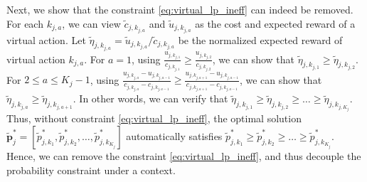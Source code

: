 Next, we show that the constraint \eqref{eq:virtual_lp_ineff} can indeed be removed.
For each $k_{j,a}$, we can view $\tilde{c}_{j,k_{j,a}}$ and $\tilde{u}_{j,k_{j,a}}$ as the cost and expected reward of a virtual action.
Let $\tilde{\eta}_{j,k_{j, a}} = \tilde{u}_{j,k_{j,a}}/\tilde{c}_{j, k_{j, a}}$ be the normalized expected reward of virtual action $k_{j,a}$.
For $a = 1$, using $\frac{u_{j, k_{j,1}}}{c_{j, k_{j,1}}} \geq \frac{u_{j, k_{j,2}}}{c_{j, k_{j,2}}}$, we can show that $\tilde{\eta}_{j,k_{j,1}} \geq \tilde{\eta}_{j,k_{j,2}}$. For $2 \leq a \leq K_j -1$,  using $\frac{u_{j, k_{j,a}} - u_{j, k_{j,a-1}}}{c_{j, k_{j,a}} - c_{j, k_{j,a-1}}} \geq \frac{u_{j, k_{j,a+1}} - u_{j, k_{j,a-1}}}{c_{j, k_{j,a+1}} - c_{j, k_{j,a-1}}}$, we can show that $\tilde{\eta}_{j,k_{j,a}} \geq \tilde{\eta}_{j,k_{j,a+1}}$. In other words, we can verify that $\tilde{\eta}_{j,k_{j,1}} \geq \tilde{\eta}_{j,k_{j,2}} \geq \ldots \geq \tilde{\eta}_{j, k_{j,K_j}}$. Thus, without constraint \eqref{eq:virtual_lp_ineff},  the optimal solution $\tilde{\boldsymbol{p}}^*_j = [\tilde{p}^*_{j, k_1}, \tilde{p}^*_{j, k_2}, \ldots, \tilde{p}^*_{j, k_{K_j}}]$
automatically satisfies 
$\tilde{p}^*_{j, k_1} \geq \tilde{p}^*_{j, k_2} \geq  \ldots \geq \tilde{p}^*_{j, k_{K_j}}$. Hence, we can remove the constraint \eqref{eq:virtual_lp_ineff}, and thus decouple the probability constraint under a context.

